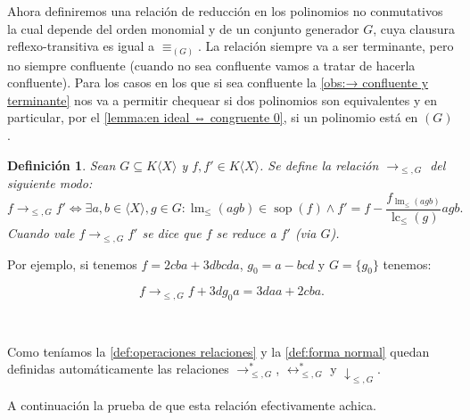 \documentclass[12pt]{report}
\theoremstyle{customstyle}
\newtheorem{definition}[theorem]{Definición}
\theoremstyle{factstyle}
\DeclareMathOperator{\sop}{sop}
\DeclareMathOperator{\lm}{lm}
\DeclareMathOperator{\lc}{lc}
\begin{document}
Ahora definiremos una relación de reducción en los polinomios no conmutativos la cual depende del orden monomial y de un conjunto generador $G$, cuya clausura reflexo-transitiva es igual a $≡_{(G)}$. La relación siempre va a ser terminante, pero no siempre confluente (cuando no sea confluente vamos a tratar de hacerla confluente). Para los casos en los que si sea confluente la \cref{obs:→ confluente y terminante} nos va a permitir chequear si dos polinomios son equivalentes y en particular, por el \cref{lemma:en ideal ⇔ congruente 0}, si un polinomio está en $(G)$.

\begin{definition}\label{def:reducciones}
  Sean $G ⊆ K⟨X⟩$ y $f, f' ∈ K⟨X⟩$. Se define la relación $→_{≤, G}$ del siguiente modo:
  \[ f →_{≤, G} f' ⇔ ∃a, b ∈ ⟨X⟩, g ∈ G : \lm_≤(agb) ∈ \sop(f) ∧ f' = f - \frac{f_{\lm_≤(agb)}}{\lc_≤(g)}agb \text{.} \]
  Cuando vale $f →_{≤, G}f'$ se dice que $f$ se reduce a $f'$ (via $G$).
\end{definition}

Por ejemplo, si tenemos $f = 2 cba + 3 dbcda$, $g_0 = a - bcd$ y $G = \{g_0\}$ tenemos:

\[f →_{≤, G} f + 3d g_0 a = 3 daa + 2 cba \text{.}\]

\

Como teníamos la \cref{def:operaciones relaciones} y la \cref{def:forma normal} quedan definidas automáticamente las relaciones $→^*_{≤, G}$, $↔^*_{≤, G}$ y $↓_{≤, G}$.

A continuación la prueba de que esta relación efectivamente achica.
\end{document}
